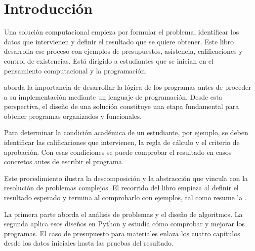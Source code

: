 \chapter{Introducción}

Una solución computacional empieza por formular el problema, identificar los datos que intervienen y definir el resultado que se quiere obtener. Este libro desarrolla ese proceso con ejemplos de presupuestos, asistencia, calificaciones y control de existencias. Está dirigido a estudiantes que se inician en el pensamiento computacional y la programación.

\textcite{farrell2013} aborda la importancia de desarrollar la lógica de los programas antes de proceder a su implementación mediante un lenguaje de programación. Desde esta perspectiva, el diseño de una solución constituye una etapa fundamental para obtener programas organizados y funcionales.

Para determinar la condición académica de un estudiante, por ejemplo, se deben identificar las calificaciones que intervienen, la regla de cálculo y el criterio de aprobación. Con esas condiciones se puede comprobar el resultado en casos concretos antes de escribir el programa.

Este procedimiento ilustra la descomposición y la abstracción que \textcite{wing2006} vincula con la resolución de problemas complejos. El recorrido del libro empieza al definir el resultado esperado y termina al comprobarlo con ejemplos, tal como resume la .


La primera parte aborda el análisis de problemas y el diseño de algoritmos. La segunda aplica esos diseños en Python y estudia cómo comprobar y mejorar los programas. El caso de presupuesto para materiales enlaza los cuatro capítulos desde los datos iniciales hasta las pruebas del resultado.
